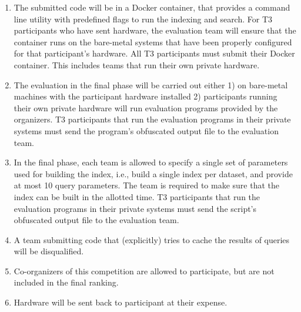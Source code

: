 \begin{enumerate}
  \item The submitted code will be in a Docker container, that
    provides a command line utility with predefined flags to run the
    indexing and search. For T3 participants who have sent hardware,
    the evaluation team will ensure that the container runs on the
    bare-metal systems that have been properly configured for that
    participant's hardware. All T3 participants must submit their
    Docker container.  This includes teams that run their own private
    hardware.


  \item The evaluation in the final phase will be carried out either
    1) on bare-metal machines with the participant hardware installed
    2) participants running their own private hardware will run
    evaluation programs provided by the organizers. T3 participants
    that run the evaluation programs in their private systems must send
    the program's obfuscated output file to the evaluation team.

  \item In the final phase, each team is allowed to specify a single
    set of parameters used for building the index, i.e., build a
    single index per dataset, and provide at most 10 query
    parameters. The team is required to make sure that the index can
    be built in the allotted time.  T3 participants that run the
    evaluation programs in their private systems must send the script's
    obfuscated output file to the evaluation team.

  \item A team submitting code that (explicitly) tries to cache the
    results of queries will be disqualified.

  \item Co-organizers of this competition are allowed to participate,
    but are not included in the final ranking.

  \item Hardware will be sent back to participant at their expense.

\end{enumerate}

